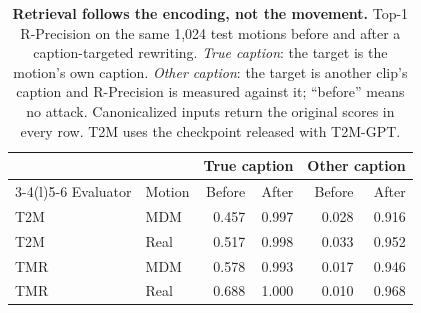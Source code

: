 \begin{table}[t]
\centering\footnotesize\setlength{\tabcolsep}{4.5pt}
\caption{\textbf{Retrieval follows the encoding, not the movement.} Top-1 R-Precision on the same 1,024 test motions before and after a caption-targeted rewriting. \emph{True caption}: the target is the motion's own caption. \emph{Other caption}: the target is another clip's caption and R-Precision is measured against it; ``before'' means no attack. Canonicalized inputs return the original scores in every row. T2M uses the checkpoint released with T2M-GPT.}\label{tab:retrieval}
\begin{tabular}{@{}llrrrr@{}}\toprule
&&\multicolumn{2}{c}{True caption}&\multicolumn{2}{c}{Other caption}\\
\cmidrule(lr){3-4}\cmidrule(l){5-6}
Evaluator&Motion&Before&After&Before&After\\\midrule
T2M~\cite{guo2022}&MDM&0.457&0.997&0.028&0.916\\
T2M~\cite{guo2022}&Real&0.517&0.998&0.033&0.952\\
TMR~\cite{tmr2023}&MDM&0.578&0.993&0.017&0.946\\
TMR~\cite{tmr2023}&Real&0.688&1.000&0.010&0.968\\
\bottomrule\end{tabular}\end{table}
